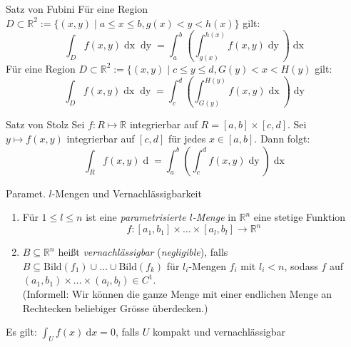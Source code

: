 \documentclass[a4paper,10pt]{article}
\def\R{\mathbb{R}}
\begin{document}
\begin{mainbox}{Satz von Fubini}
    Für eine Region $D \subset \R^2 := \{\left(x,y\right) \mid a \le x \le b, g(x) < y < h(x)\}$ gilt:
    $$\int_D f(x,y)\mathop{dx} \mathop{dy} = \int_a^b \left(\int_{g(x)}^{h(x)} f(x,y) \mathop{dy}\right)\mathop{dx}$$
    Für eine Region $D \subset \R^2 := \{ \left(x,y\right) \mid c \le y \le d, G(y) < x < H(y)$ gilt:
    $$\int_D f(x,y) \mathop{dx} \mathop{dy} = \int_c^d \left(\int_{G(y)}^{H(y)} f(x,y)\mathop{dx}\right) \mathop{dy}$$
\end{mainbox}
\begin{subbox}{Satz von Stolz}
    Sei $f: R \mapsto \R$ integrierbar auf $R = \left[a,b\right] \times \left[c,d\right]$. Sei $y \mapsto f(x,y)$ integrierbar auf $\left[c,d\right]$ für jedes $x \in \left[a,b\right]$. Dann folgt:
    $$\int_R f(x,y) \mathop{d(x,y)} = \int_a^b \left(\int_c^d f(x,y) \mathop{dy}\right) \mathop{dx}$$
\end{subbox}

\begin{mainbox}{Paramet. $l$-Mengen und Vernachlässigbarkeit}
    \begin{enumerate}
        \item Für $1\leq l\leq n$ ist eine \textit{parametrisierte $l$-Menge} in $\mathbb{R}^{n}$ eine stetige Funktion 
        $$f:[a_{1},b_{1}]\times\dots \times [a_{l},b_{l}]\to \mathbb{R}^{n}$$
        \item $B\subseteq \mathbb{R}^{n}$ heißt \textit{vernachlässigbar} (\textit{negligible}), falls $B\subseteq \text{Bild}(f_{1})\cup\dots \cup \text{Bild}(f_{k})$ für $l_{i}$-Mengen $f_{i}$ mit $l_{i}<n$, sodass $f$ auf $(a_{1},b_{1})\times\dots \times (a_{l},b_{l}) \in C^{1}$.\\
            (Informell: Wir können die ganze Menge mit einer endlichen Menge an Rechtecken beliebiger Grösse überdecken.)
    \end{enumerate}
    
    
     Es gilt: $\int_U f(x) \ \text{d}x=0$, falls $U$ kompakt und vernachlässigbar
\end{mainbox}
\end{document}
